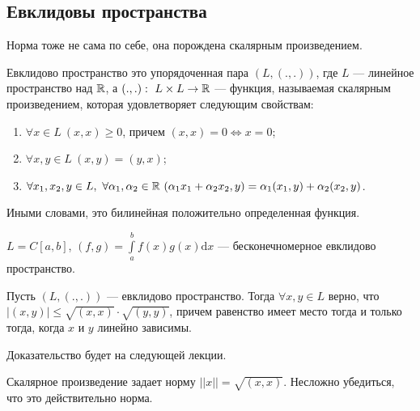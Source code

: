 \documentclass[a4paper, 12pt]{article}
\begin{document}
\subsection*{Евклидовы пространства}
Норма тоже не сама по себе, она порождена скалярным произведением.
\begin{Def}
Евклидово пространство это упорядоченная пара $(L, (., .))$, где $L$ --- линейное пространство над $\mathbb{R}$, а $(., .):\ L\times L \to \mathbb{R}$ --- функция, называемая скалярным произведением, которая удовлетворяет следующим свойствам:
\begin{enumerate}
\item $\forall x \in L\ (x, x) \geq 0$, причем $(x, x) = 0 \Leftrightarrow x = 0$;
\item $\forall x, y\in L\ (x, y) = (y, x)$;
\item $\forall x_1, x_2, y \in L,\ \forall \alpha_1, \alpha_2 \in \mathbb{R}\ (\alpha_1x_1 + \alpha_2x_2, y) = \alpha_1(x_1, y) + \alpha_2(x_2, y)$.
\end{enumerate}
Иными словами, это билинейная положительно определенная функция.
\end{Def}

\begin{Examples}
$L = C[a, b]$, $(f, g) = \int\limits_a^bf(x)g(x)\mathrm{d}x$ --- бесконечномерное евклидово пространство.
\end{Examples}

\begin{Theorem}
Пусть $(L, (., .))$ --- евклидово пространство. Тогда $\forall x, y \in L$ верно, что $|(x, y)| \leq \sqrt{(x, x)}\cdot\sqrt{(y, y)}$, причем равенство имеет место тогда и только тогда, когда $x$ и $y$ линейно зависимы.
\end{Theorem}
Доказательство будет на следующей лекции.

\begin{Statement}
Скалярное произведение задает норму $||x|| = \sqrt{(x, x)}$. Несложно убедиться, что это действительно норма.
\end{Statement}
\end{document}
